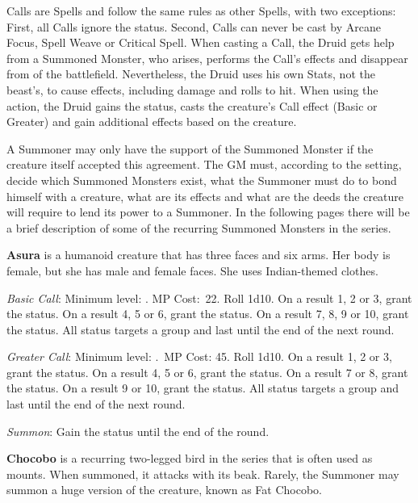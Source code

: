 \begin{multicols}{2}
	
    Calls are Spells and follow the same rules as other Spells, with two exceptions: First, all Calls ignore the  status. Second, Calls can never be cast by Arcane Focus, Spell Weave or Critical Spell. When casting a Call, the Druid gets help from a Summoned Monster, who arises, performs the Call’s effects and disappear from of the battlefield. Nevertheless, the Druid uses his own Stats, not the beast’s, to cause effects, including damage and rolls to hit. When using the  action, the Druid gains the  status, casts the creature’s Call effect (Basic or Greater) and gain additional effects based on the creature.

    A Summoner may only have the support of the Summoned Monster if the creature itself accepted this agreement. The GM must, according to the setting, decide which Summoned Monsters exist, what the Summoner must do to bond himself with a creature, what are its effects and what are the deeds the creature will require to lend its power to a Summoner. In the following pages there will be a brief description of some of the recurring Summoned Monsters in the series.
    
    \textbf{Asura} is a humanoid creature that has three faces and six arms. Her body is female, but she has male and female faces. She uses Indian-themed clothes.
    
	\textit{Basic Call}: Minimum level: . MP Cost:\ 22. Roll 1d10. On a result 1, 2 or 3, grant the  status. On a result 4, 5 or 6, grant the  status. On a result 7, 8, 9 or 10, grant the  status. All status targets a group and last until the end of the next round.
    
    \textit{Greater Call}: Minimum level: .\ MP Cost: 45. Roll 1d10. On a result 1, 2 or 3, grant the  status. On a result 4, 5 or 6, grant the  status. On a result 7 or 8, grant the  status. On a result 9 or 10, grant the  status. All status targets a group and last until the end of the next round.
    
    \textit{Summon}: Gain the  status until the end of the round.
	
    \textbf{Chocobo} is a recurring two-legged bird in the series that is often used as mounts. When summoned, it attacks with its beak. Rarely, the Summoner may summon a huge version of the creature, known as Fat Chocobo.


\end{multicols}
